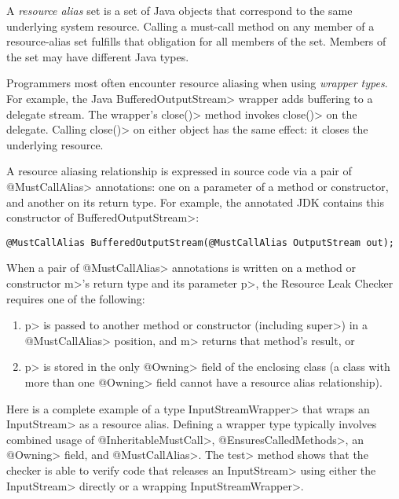 A \emph{resource alias} set is a set of Java objects that
correspond to the same underlying system resource.
Calling a must-call method on any member of a resource-alias set
fulfills that obligation for all members of the set.
Members of the set may have different Java types.

Programmers most often encounter resource aliasing when using \emph{wrapper types}.
For example, the Java \<Buffered\-Output\-Stream> wrapper adds buffering to a
delegate stream.
The wrapper's \<close()> method invokes \<close()> on the delegate.  Calling
\<close()> on either object has the same effect:  it closes the underlying resource.

A resource aliasing relationship is expressed in source code via a pair of \<@MustCallAlias> annotations:
one on a parameter of a method or constructor, and another on its return type.
For example, the annotated JDK contains this constructor of \<BufferedOutputStream>:
\begin{Verbatim}
@MustCallAlias BufferedOutputStream(@MustCallAlias OutputStream out);
\end{Verbatim}

When a pair of \<@MustCallAlias> annotations is written on a method or constructor \<m>'s return type
and its parameter \<p>, the Resource Leak Checker requires one of the following:
\begin{enumerate}
\item \<p> is passed to another method or constructor (including \<super>) in a
  \<@MustCallAlias> position, and \<m> returns that method's result, or
\item \<p> is stored in the only \<@Owning> field of the enclosing class (a class with more than one
  \<@Owning> field cannot have a resource alias relationship).
\end{enumerate}


Here is a complete example of a type \<InputStreamWrapper> that wraps an \<InputStream> as a resource alias.  Defining a wrapper type typically involves combined usage of \<@InheritableMustCall>, \<@EnsuresCalledMethods>, an \<@Owning> field, and \<@MustCallAlias>.  The \<test> method shows that the checker is able to verify code that releases an \<InputStream> using either the \<InputStream> directly or a wrapping \<InputStreamWrapper>.

